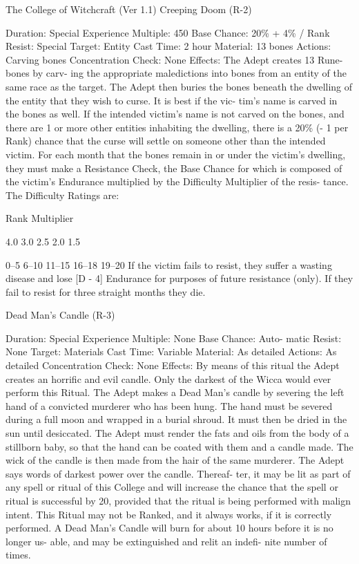 \begin{Chapter}{The College of Witchcraft (Ver 1.1)}
Creeping Doom (R-2) 

Duration: Special 
Experience Multiple: 450 
Base Chance: 20\% + 4\% / Rank 
Resist: Special 
Target: Entity 
Cast Time: 2 hour 
Material: 13 bones 
Actions: Carving bones 
Concentration Check: None 
Effects: The Adept creates 13 Rune-bones by carv-
ing  the  appropriate  maledictions  into  bones  from 
an entity of the same race as the target. The Adept 
then  buries  the  bones  beneath  the  dwelling  of  the 
entity  that  they  wish  to  curse.  It  is  best  if  the  vic-
tim’s  name  is  carved  in  the  bones  as  well.  If  the 
intended victim’s name is not carved on the bones, 
and there are 1 or more other entities inhabiting the 
dwelling, there is a 20\% (- 1 per Rank) chance that 
the  curse  will  settle  on  someone  other  than  the 
intended  victim.  For  each  month  that  the  bones 
remain in or under the victim’s dwelling, they must 
make  a  Resistance  Check,  the  Base  Chance  for 
which  is  composed  of  the  victim’s  Endurance 
multiplied by the Difficulty Multiplier of the resis-
tance. The Difficulty Ratings are: 

Rank  Multiplier 

4.0 
3.0 
2.5 
2.0 
1.5 

0–5 
6–10 
11–15 
16–18 
19–20 
If  the  victim  fails  to  resist,  they  suffer  a  wasting 
disease and lose [D - 4] Endurance for purposes of 
future  resistance  (only).  If  they  fail  to  resist  for 
three straight months they die. 

Dead Man’s Candle (R-3) 

Duration: Special 
Experience  Multiple:  None  Base  Chance:  Auto-
matic 
Resist: None 
Target: Materials 
Cast Time: Variable 
Material: As detailed 
Actions: As detailed 
Concentration Check: None 
Effects:  By  means  of  this  ritual  the  Adept  creates 
an horrific and evil candle. Only the darkest of the 
Wicca  would  ever  perform  this  Ritual.  The  Adept 
makes  a  Dead  Man’s  candle  by  severing  the  left 
hand  of  a  convicted  murderer  who  has been  hung. 
The  hand must be  severed  during a  full  moon  and 
wrapped in a burial shroud. It must then be dried in 
the sun until desiccated. The Adept must render the 
fats  and  oils  from the  body  of  a  stillborn  baby,  so 
that the hand can be coated with them and a candle 
made.  The  wick  of  the  candle  is  then  made  from 
the  hair  of  the  same  murderer.  The  Adept  says 
words  of  darkest  power  over  the  candle.  Thereaf-
ter, it may be lit as part of any spell or ritual of this 
College and will increase the chance that the spell 
or ritual is successful by 20, provided that the ritual 
is being performed with malign intent. This Ritual 
may  not  be  Ranked,  and  it  always  works,  if  it  is 
correctly  performed.  A  Dead  Man’s  Candle  will 
burn  for  about  10  hours  before  it  is  no  longer  us-
able,  and  may  be  extinguished  and  relit  an  indefi-
nite number of times. 


\end{Chapter}
